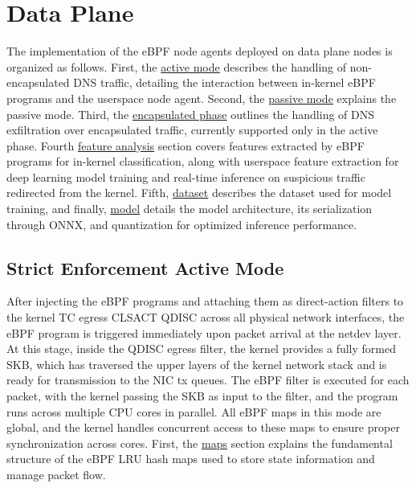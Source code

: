 \documentclass [11pt, proquest] {uwthesis}[2020/02/24]
\begin{document}
\section{Data Plane}
The implementation of the eBPF node agents deployed on data plane nodes is organized as follows. First, the \hyperref[sec:active]{active mode} describes the handling of non-encapsulated DNS traffic, detailing the interaction between in-kernel eBPF programs and the userspace node agent. Second, the \hyperref[sec:passive]{passive mode} explains the passive  mode. Third, the \hyperref[sec:encap]{encapsulated phase} outlines the handling of DNS exfiltration over encapsulated traffic, currently supported only in the active phase. Fourth \hyperref[sec:feature]{feature analysis} section covers features extracted by eBPF programs for in-kernel classification, along with userspace feature extraction for deep learning model training and real-time inference on suspicious traffic redirected from the kernel. Fifth, \hyperref[sec:dataset]{dataset} describes the dataset used for model training, and finally, \hyperref[sec:model]{model} details the model architecture, its serialization through ONNX, and quantization for optimized inference performance.


\subsection{Strict Enforcement Active Mode}
\label{sec:active}
After injecting the eBPF programs and attaching them as direct-action filters to the kernel TC egress CLSACT QDISC across all physical network interfaces, the eBPF program is triggered immediately upon packet arrival at the netdev layer. At this stage, inside the QDISC egress filter, the kernel provides a fully formed SKB, which has traversed the upper layers of the kernel network stack and is ready for transmission to the NIC tx queues. The eBPF filter is executed for each packet, with the kernel passing the SKB as input to the filter, and the program runs across multiple CPU cores in parallel. All eBPF maps in this mode are global, and the kernel handles concurrent access to these maps to ensure proper synchronization across cores. First, the \hyperref[sec:dp_eBPF_LRU_Maps_active]{maps} section explains the fundamental structure of the eBPF LRU hash maps used to store state information and manage packet flow.
\end{document}
